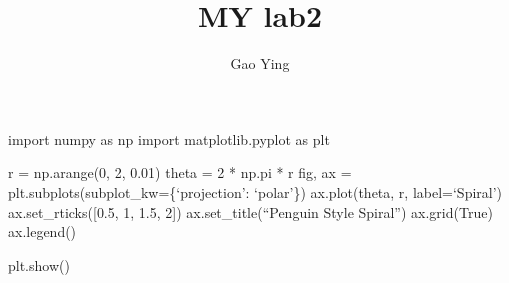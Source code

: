 \documentclass[
  ignorenonframetext,
]{beamer}
\title{MY lab2}
\author{Gao Ying}
\date{}
\begin{document}
\frame{\titlepage}


\begin{frame}
import numpy as np import matplotlib.pyplot as plt

r = np.arange(0, 2, 0.01) theta = 2 * np.pi * r fig, ax =
plt.subplots(subplot\_kw=\{`projection': `polar'\}) ax.plot(theta, r,
label=`Spiral') ax.set\_rticks({[}0.5, 1, 1.5, 2{]})
ax.set\_title(``Penguin Style Spiral'') ax.grid(True) ax.legend()

plt.show()
\end{frame}
\end{document}
